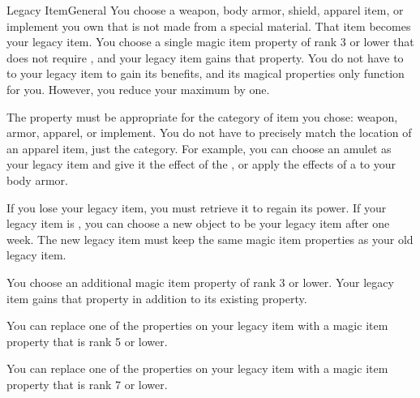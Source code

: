   \begin{magicalfeat}{Legacy Item}{General}
     You choose a  weapon, body armor, shield, apparel item, or implement you own that is not made from a special material.
    That item becomes your legacy item.
    You choose a single magic item property of rank 3 or lower that does not require , and your legacy item gains that property.
    You do not have to  to your legacy item to gain its benefits, and its magical properties only function for you.
    However, you reduce your maximum  by one.

    The property must be appropriate for the category of item you chose: weapon, armor, apparel, or implement.
    You do not have to precisely match the location of an apparel item, just the category.
    For example, you can choose an amulet as your legacy item and give it the effect of the , or apply the effects of a  to your body armor.

    If you lose your legacy item, you must retrieve it to regain its power.
    If your legacy item is , you can choose a new object to be your legacy item after one week.
    The new legacy item must keep the same magic item properties as your old legacy item.

     You choose an additional magic item property of rank 3 or lower.
    Your legacy item gains that property in addition to its existing property.

     You can replace one of the properties on your legacy item with a magic item property that is rank 5 or lower.

     You can replace one of the properties on your legacy item with a magic item property that is rank 7 or lower.
  \end{magicalfeat}


